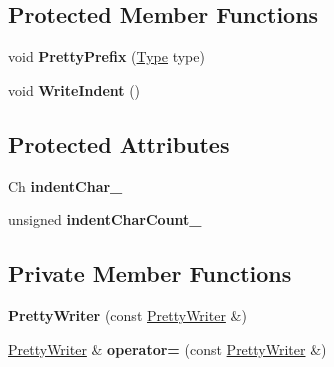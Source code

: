 \subsection*{Protected Member Functions}
\begin{DoxyCompactItemize}
\item 
void {\bfseries Pretty\+Prefix} (\hyperlink{rapidjson_8h_a1d1cfd8ffb84e947f82999c682b666a7}{Type} type)\hypertarget{class_pretty_writer_a7841433d45abbfc5a1799be0ca1ed792}{}\label{class_pretty_writer_a7841433d45abbfc5a1799be0ca1ed792}

\item 
void {\bfseries Write\+Indent} ()\hypertarget{class_pretty_writer_a649ec900d77960e085f76bb4d3c351d9}{}\label{class_pretty_writer_a649ec900d77960e085f76bb4d3c351d9}

\end{DoxyCompactItemize}
\subsection*{Protected Attributes}
\begin{DoxyCompactItemize}
\item 
Ch {\bfseries indent\+Char\+\_\+}\hypertarget{class_pretty_writer_a2cee1f24795fd6c56420df31d336c41d}{}\label{class_pretty_writer_a2cee1f24795fd6c56420df31d336c41d}

\item 
unsigned {\bfseries indent\+Char\+Count\+\_\+}\hypertarget{class_pretty_writer_ab2cffe9d93ce8a4890f927832f00d9f1}{}\label{class_pretty_writer_ab2cffe9d93ce8a4890f927832f00d9f1}

\end{DoxyCompactItemize}
\subsection*{Private Member Functions}
\begin{DoxyCompactItemize}
\item 
{\bfseries Pretty\+Writer} (const \hyperlink{class_pretty_writer}{Pretty\+Writer} \&)\hypertarget{class_pretty_writer_a0a148896cef5415407f49d165882c373}{}\label{class_pretty_writer_a0a148896cef5415407f49d165882c373}

\item 
\hyperlink{class_pretty_writer}{Pretty\+Writer} \& {\bfseries operator=} (const \hyperlink{class_pretty_writer}{Pretty\+Writer} \&)\hypertarget{class_pretty_writer_a5ee0883bff3b61e0f613ed831e2ece4b}{}\label{class_pretty_writer_a5ee0883bff3b61e0f613ed831e2ece4b}

\end{DoxyCompactItemize}
